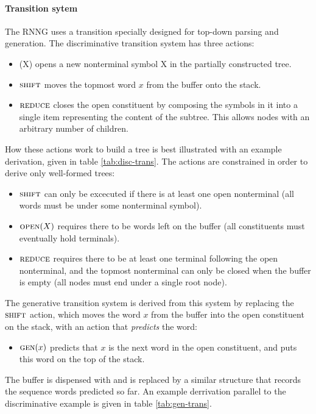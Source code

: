 \paragraph{Transition sytem}
The RNNG uses a transition specially designed for top-down parsing and generation. The discriminative transition system has three actions:
\begin{itemize}
  \item \open(X) opens a new nonterminal symbol X in the partially constructed tree.
  \item $\textsc{shift}$ moves the topmost word $x$ from the buffer onto the stack.
  \item $\textsc{reduce}$ closes the open constituent by composing the symbols in it into a single item representing the content of the subtree. This allows nodes with an arbitrary number of children.
\end{itemize}
How these actions work to build a tree is best illustrated with an example derivation, given in table \ref{tab:disc-trans}. The actions are constrained in order to derive only well-formed trees:
\begin{itemize}
  \item $\textsc{shift}$ can only be excecuted if there is at least one open nonterminal (all words must be under some nonterminal symbol).
  \item $\textsc{open}(X)$ requires there to be words left on the buffer (all constituents must eventually hold terminals).
  \item $\textsc{reduce}$ requires there to be at least one terminal following the open nonterminal, and the topmost nonterminal can only be closed when the buffer is empty (all nodes must end under a single root node).
\end{itemize}
The generative transition system is derived from this system by replacing the $\textsc{shift}$ action, which moves the word $x$ from the buffer into the open constituent on the stack, with an action that \textit{predicts} the word:
\begin{itemize}
  \item $\textsc{gen}(x)$ predicts that $x$ is the next word in the open constituent, and puts this word on the top of the stack.
\end{itemize}
The buffer is dispensed with and is replaced by a similar structure that records the sequence words predicted so far. An example derrivation parallel to the discriminative example is given in table \ref{tab:gen-trans}.



